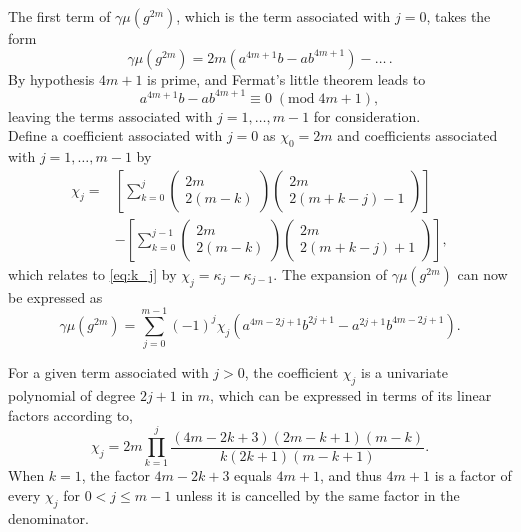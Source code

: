 \documentclass[oneside,english,man]{amsart}
\numberwithin{equation}{section}
\numberwithin{figure}{section}
\begin{document}
The first term of $\gamma\mu(g^{2m})$, which is the term associated with $j=0$, takes the form
\begin{equation*}
	\gamma\mu(g^{2m})=2m\left(a^{4m+1}b-ab^{4m+1}\right)-\ldots\,.
\end{equation*}
By hypothesis $4m+1$ is prime, and Fermat's little theorem leads to
\begin{equation*}
	a^{4m+1}b-ab^{4m+1}\equiv 0\;(\mathrm{mod}\;4m+1),
\end{equation*}
leaving the terms associated with $j=1,\ldots,m-1$ for consideration.
\\

Define a coefficient associated with $j=0$ as $\chi_0=2m$ and coefficients associated with $j=1,\ldots,m-1$ by
\begin{equation}\label{eq:x_j}
	\begin{split}
		\chi_j = &\left[\sum_{k=0}^j \begin{pmatrix} 2m\\2(m-k) \end{pmatrix} \begin{pmatrix} 2m\\2(m+k-j)-1 \end{pmatrix}\right] \\
		&-\left[\sum_{k=0}^{j-1} \begin{pmatrix} 2m\\2(m-k) \end{pmatrix} \begin{pmatrix} 2m\\2(m+k-j)+1 \end{pmatrix}\right],
	\end{split}
\end{equation}
which relates to \eqref{eq:k_j} by $\chi_j=\kappa_j-\kappa_{j-1}$.  The expansion of $\gamma\mu(g^{2m})$ can now be expressed as
\begin{equation*}
	\gamma\mu(g^{2m})=\sum_{j=0}^{m-1} (-1)^j \chi_j\left(a^{4m-2j+1}b^{2j+1}-a^{2j+1}b^{4m-2j+1}\right).
\end{equation*}

For a given term associated with $j>0$, the coefficient $\chi_j$ is a univariate polynomial of degree $2j+1$ in $m$, which can be expressed in terms of its linear factors according to,
\begin{equation} \label{eq:x_prod}
	\chi_j = 2m\prod_{k=1}^j \frac{(4m-2k+3)(2m-k+1)(m-k)}{k(2k+1)(m-k+1)}.
\end{equation}
When $k=1$, the factor $4m-2k+3$ equals $4m+1$, and thus $4m+1$ is a factor of every $\chi_j$ for $0<j\leq m-1$ unless it is cancelled by the same factor in the denominator.
\\
\end{document}
